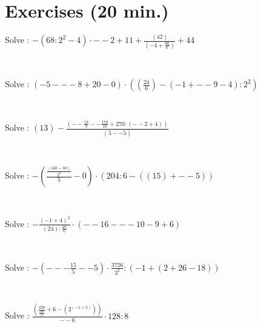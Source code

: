 \documentclass[english,course]{lecture}
\begin{document}
\section{Exercises  (20 min.)}
\begin{enumerate}
\begin{minipage}{\linewidth}
\item Solve : \(-\left(68:{2}^{2}-4\right) \cdot --2+11+\frac{\left(42\right)}{\left(-4+\frac{60}{6}\right)}+44\)
\end{minipage} \\
\begin{minipage}{\linewidth}
\item Solve : \(\left(-5---8+20-0\right) \cdot \left(\left(\frac{24}{6}\right)-\left(-1+--9-4\right):{2}^{2}\right)\)
\end{minipage} \\
\begin{minipage}{\linewidth}
\item Solve : \(\left(13\right)-\frac{\left(--\frac{18}{9}--\frac{170}{10}+270:\left(--2+4\right)\right)}{\left(5--5\right)}\)
\end{minipage} \\
\begin{minipage}{\linewidth}
\item Solve : \(-\left(\frac{\frac{\left(160-80\right)}{{2}^{3}}}{5}-0\right) \cdot \left(204:6-\left(\left(15\right)+--5\right)\right)\)
\end{minipage} \\
\begin{minipage}{\linewidth}
\item Solve : \(-\frac{{\left(-1+4\right)}^{2}}{\left(24\right):\frac{48}{6}} \cdot \left(--16---10-9+6\right)\)
\end{minipage} \\
\begin{minipage}{\linewidth}
\item Solve : \(-\left(---\frac{15}{5}--5\right) \cdot \frac{3726}{{3}^{2}}:\left(-1+\left(2+26-18\right)\right)\)
\end{minipage} \\
\begin{minipage}{\linewidth}
\item Solve : \(\frac{\left(\frac{220}{\frac{100}{10}}+6-\left({2}^{\left(-1+5\right)}\right)\right)}{--6} \cdot 128:8\)

\end{minipage}
\end{enumerate}
\end{document}
